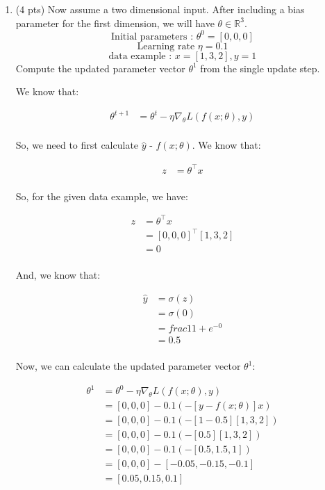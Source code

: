 \documentclass[a4paper]{article}
\theoremstyle{definition}
\newenvironment{soln}{
    \leavevmode\color{blue}\ignorespaces
}{}
\begin{document}
\begin{enumerate}
\begin{enumerate}
	\item (4 pts)
 Now assume a two dimensional input. After including a bias parameter for the first dimension, we will have $\theta\in\mathbb{R}^3$.
$$ \text{Initial parameters : }  \theta^{0}=[0, 0, 0]$$
$$ \text{Learning rate }\eta=0.1$$
$$ \text{data example : } x=[1, 3, 2], y=1$$
Compute the updated parameter vector $\theta^{1}$ from the single update step.
	
	\begin{soln}  We know that:

		$$
		\begin{align}
		\theta^{t+1} &= \theta^{t} - \eta \nabla_{\theta} L(f(x;\theta), y) \\
		\end{align}
		$$
		
		So, we need to first calculate $\hat{y}$ - $f(x;\theta)$. We know that:
		
		$$
		\begin{align}
		z &= \theta^\top x \\
		\end{align}
		$$
		
		So, for the given data example, we have:
		
		$$
		\begin{align}
		z &= \theta^\top x \\
		&= [0, 0, 0]^\top [1, 3, 2] \\
		&= 0 \\
		\end{align}
		$$
		
		And, we know that:
		
		$$
		\begin{align}
		\hat{y} &= \sigma(z) \\
		&= \sigma(0) \\
		&= frac{1}{1 + e^{-0}} \\
		&= 0.5 \\
		\end{align}
		$$
		
		Now, we can calculate the updated parameter vector $\theta^{1}$:
		
		$$
		\begin{align}
		\theta^{1} &= \theta^{0} - \eta \nabla_{\theta} L(f(x;\theta), y) \\
		&= [0, 0, 0] - 0.1 (-[y - f(x;\theta)] x) \\
		&= [0, 0, 0] - 0.1 (-[1 - 0.5] [1, 3, 2]) \\
		&= [0, 0, 0] - 0.1 (-[0.5] [1, 3, 2]) \\
		&= [0, 0, 0] - 0.1 (-[0.5, 1.5, 1]) \\
		&= [0, 0, 0] - [-0.05, -0.15, -0.1] \\
		&= [0.05, 0.15, 0.1] \\
		\end{align}
		$$    
	\end{soln}
\end{enumerate}
\end{enumerate}
\end{document}
